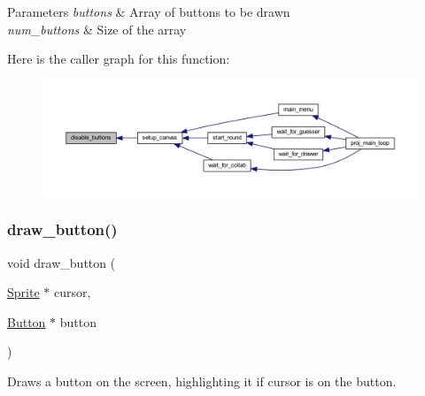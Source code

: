 \begin{DoxyParams}{Parameters}
{\em buttons} & Array of buttons to be drawn \\
\hline
{\em num\+\_\+buttons} & Size of the array \\
\hline
\end{DoxyParams}
Here is the caller graph for this function\+:\nopagebreak
\begin{figure}[H]
\begin{center}
\leavevmode
\includegraphics[width=350pt]{group__sprite_ga7438e498241a820e8b1f4ab63e42c99b_icgraph}
\end{center}
\end{figure}
\mbox{\label{group__sprite_ga39cf20a4f80d3e42f7ecc3dab4bd7b65}} 
\subsubsection{\texorpdfstring{draw\+\_\+button()}{draw\_button()}}
{\footnotesize\ttfamily void draw\+\_\+button (\begin{DoxyParamCaption}\item[{\mbox{\hyperlink{struct_sprite}{Sprite}} $\ast$}]{cursor,  }\item[{\mbox{\hyperlink{struct_button}{Button}} $\ast$}]{button }\end{DoxyParamCaption})}



Draws a button on the screen, highlighting it if cursor is on the button. 


